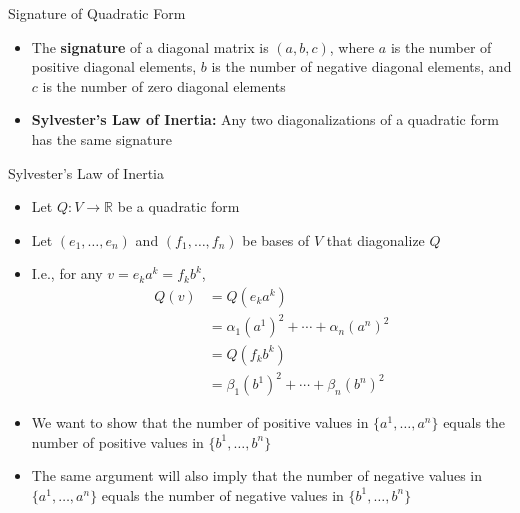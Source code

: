 \documentclass[usenames,dvipsnames,10pt]{beamer}
\newcommand{\R}{\mathbb{R}}
\begin{document}
\begin{frame}
  {Signature of Quadratic Form}

  \begin{itemize}
  \item The {\bf signature} of a diagonal matrix is $(a,b,c)$, where $a$ is the number of positive diagonal elements, $b$ is the number of negative diagonal elements, and $c$ is the number of zero diagonal elements
  \item {\bf Sylvester's Law of Inertia:} Any two diagonalizations of a quadratic form has the same signature
  \end{itemize}
\end{frame}

\begin{frame}
  {Sylvester's Law of Inertia}
  
  \begin{itemize}
  \item Let $Q: V \rightarrow \R$ be a quadratic form
  \item Let $(e_1, \dots, e_n)$ and $(f_1, \dots, f_n)$ be bases of $V$ that diagonalize $Q$
  \item I.e., for any $v = e_ka^k = f_kb^k$,
    \begin{align*}
      Q(v) &= Q(e_ka^k)\\
           &= \alpha_1(a^1)^2 + \cdots + \alpha_n(a^n)^2\\
           &= Q(f_kb^k)\\
           &= \beta_1(b^1)^2 + \cdots + \beta_n(b^n)^2
    \end{align*}
  \item We want to show that the number of positive values in $\{a^1, \dots, a^n\}$ equals the number of positive values in $\{b^1,\dots, b^n\}$
  \item The same argument will also imply that the number of negative values in $\{a^1, \dots, a^n\}$ equals the number of negative values in $\{b^1,\dots, b^n\}$
  \end{itemize}
\end{frame}
\end{document}

